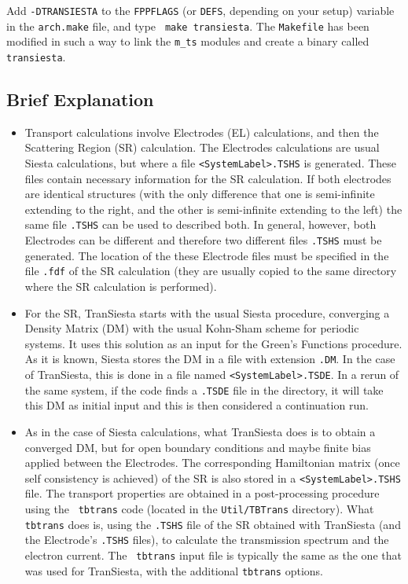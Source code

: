 \documentclass[11pt]{article}
\begin{document}
Add {\tt -DTRANSIESTA} to the {\tt FPPFLAGS} (or {\tt DEFS}, depending
on your setup) variable in the {\tt arch.make} file, and type {\tt
  make transiesta}.  The {\tt Makefile} has been modified in such a
way to link the {\tt m\_ts} modules and create a binary called {\tt
  transiesta}.

\subsection{Brief Explanation}

\begin{itemize}
\item 
Transport calculations involve Electrodes (EL) calculations, and
then the Scattering Region (SR) calculation.  
The Electrodes calculations are usual {\sc Siesta} calculations, 
but where a file {\tt <SystemLabel>.TSHS} is generated.  
These files contain necessary information for the SR calculation. 
If both electrodes are identical structures (with the only difference
that one is semi-infinite extending to the right, and the other is 
semi-infinite extending to the left) the same file {\tt .TSHS}
can be used to described both.
In general, however, both Electrodes can be different and therefore 
two different files {\tt .TSHS} must be generated. 
The location of the these Electrode files must be specified 
in the file {\tt .fdf} of the SR calculation (they are usually copied to the 
same directory where the SR calculation is performed).

\item
For the SR, {\sc TranSiesta} starts with the usual {\sc Siesta} procedure,
converging a Density Matrix (DM) with the usual Kohn-Sham scheme for
periodic systems. It uses this solution as an input for the Green's
Functions procedure. As it is known, {\sc Siesta} stores the DM in a file
with extension {\tt .DM}. In the case of {\sc TranSiesta}, this is done 
in a file named {\tt <SystemLabel>.TSDE}. 
In a rerun of the same system, if the code finds a {\tt.TSDE} file in 
the directory, it will take this DM as initial input and
this is then considered a continuation run.

\item
As in the case of {\sc Siesta} calculations, what {\sc TranSiesta}
does is to obtain a converged DM, but for open boundary conditions and
maybe finite bias applied between the Electrodes. The corresponding
Hamiltonian matrix (once self consistency is achieved) of the SR is
also stored in a {\tt <SystemLabel>.TSHS} file. The transport
properties are obtained in a post-processing procedure using the {\tt
  tbtrans} code (located in the {\tt Util/TBTrans} directory). What
{\tt tbtrans} does is, using the {\tt .TSHS} file of the SR obtained
with {\sc TranSiesta} (and the Electrode's {\tt .TSHS} files), to
calculate the transmission spectrum and the electron current. The {\tt
  tbtrans} input file is typically the same as the one that was used
for {\sc TranSiesta}, with the additional {\tt tbtrans} options.


\end{itemize}
\end{document}
